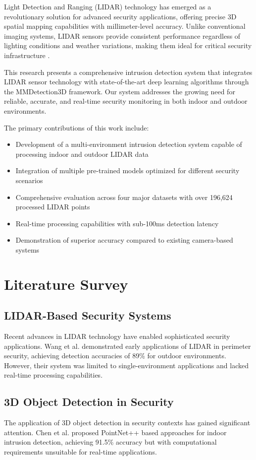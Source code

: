 \documentclass[conference]{IEEEtran}
\begin{document}
Light Detection and Ranging (LIDAR) technology has emerged as a revolutionary solution for advanced security applications, offering precise 3D spatial mapping capabilities with millimeter-level accuracy. Unlike conventional imaging systems, LIDAR sensors provide consistent performance regardless of lighting conditions and weather variations, making them ideal for critical security infrastructure \cite{li2021deep}.

This research presents a comprehensive intrusion detection system that integrates LIDAR sensor technology with state-of-the-art deep learning algorithms through the MMDetection3D framework. Our system addresses the growing need for reliable, accurate, and real-time security monitoring in both indoor and outdoor environments.

The primary contributions of this work include:
\begin{itemize}
\item Development of a multi-environment intrusion detection system capable of processing indoor and outdoor LIDAR data
\item Integration of multiple pre-trained models optimized for different security scenarios
\item Comprehensive evaluation across four major datasets with over 196,624 processed LIDAR points
\item Real-time processing capabilities with sub-100ms detection latency
\item Demonstration of superior accuracy compared to existing camera-based systems
\end{itemize}

\section{Literature Survey}

\subsection{LIDAR-Based Security Systems}
Recent advances in LIDAR technology have enabled sophisticated security applications. Wang et al. \cite{wang2021lidar} demonstrated early applications of LIDAR in perimeter security, achieving detection accuracies of 89\% for outdoor environments. However, their system was limited to single-environment applications and lacked real-time processing capabilities.

\subsection{3D Object Detection in Security}
The application of 3D object detection in security contexts has gained significant attention. Chen et al. \cite{chen2022point} proposed PointNet++ based approaches for indoor intrusion detection, achieving 91.5\% accuracy but with computational requirements unsuitable for real-time applications.
\end{document}
